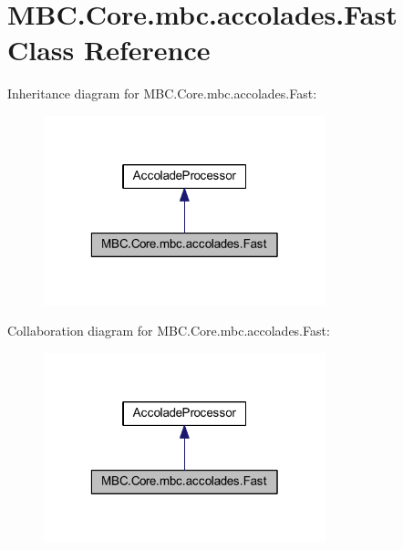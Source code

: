 \hypertarget{class_m_b_c_1_1_core_1_1mbc_1_1accolades_1_1_fast}{\section{M\-B\-C.\-Core.\-mbc.\-accolades.\-Fast Class Reference}
\label{class_m_b_c_1_1_core_1_1mbc_1_1accolades_1_1_fast}
}


Inheritance diagram for M\-B\-C.\-Core.\-mbc.\-accolades.\-Fast\-:\nopagebreak
\begin{figure}[H]
\begin{center}
\leavevmode
\includegraphics[width=232pt]{class_m_b_c_1_1_core_1_1mbc_1_1accolades_1_1_fast__inherit__graph}
\end{center}
\end{figure}


Collaboration diagram for M\-B\-C.\-Core.\-mbc.\-accolades.\-Fast\-:\nopagebreak
\begin{figure}[H]
\begin{center}
\leavevmode
\includegraphics[width=232pt]{class_m_b_c_1_1_core_1_1mbc_1_1accolades_1_1_fast__coll__graph}
\end{center}
\end{figure}
